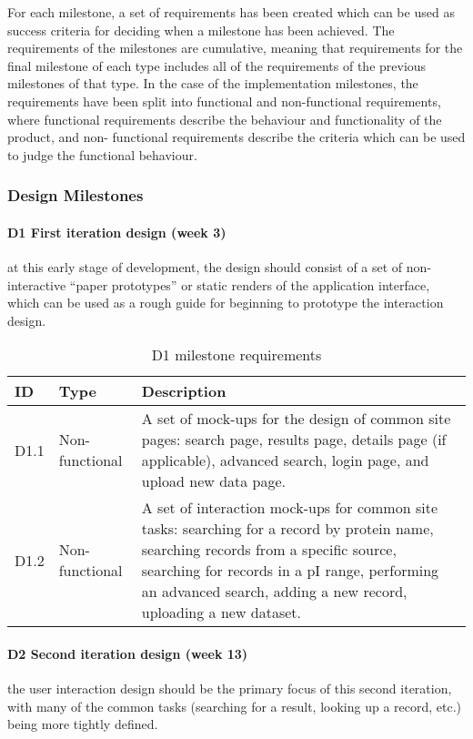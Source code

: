 For each milestone, a set of requirements has been created which can be used as
success criteria for deciding when a milestone has been achieved. The
requirements of the milestones are cumulative, meaning that requirements for the
final milestone of each type includes all of the requirements of the previous
milestones of that type. In the case of the implementation milestones, the
requirements have been split into functional and non-functional requirements,
where functional requirements describe the behaviour and functionality of the
product, and non- functional requirements describe the criteria which can be
used to judge the functional behaviour.

\subsubsection{Design Milestones}

\paragraph{D1 First iteration design (week 3)} at this early stage of
development, the design should consist of a set of non-interactive ``paper
prototypes'' or static renders of the application interface, which can be used
as a rough guide for beginning to prototype the interaction design.

\begin{table}[H]
\centering
\begin{tabular}{ l l p{12cm} }
\textbf{ID} & \textbf{Type} & \textbf{Description}\\ \hline

D1.1 & Non-functional & A set of mock-ups for the design of common site pages:
search page, results page, details page (if applicable), advanced search, login
page, and upload new data page.\\

D1.2 & Non-functional & A set of interaction mock-ups for common site tasks:
searching for a record by protein name, searching records from a specific
source, searching for records in a pI range, performing an advanced search,
adding a new record, uploading a new dataset.\\

\hline
\end{tabular}
\caption{D1 milestone requirements}
\label{tab:d1-requirements}
\end{table}

\paragraph{D2 Second iteration design (week 13)} the user interaction design
should be the primary focus of this second iteration, with many of the common
tasks (searching for a result, looking up a record, etc.) being more tightly
defined.

